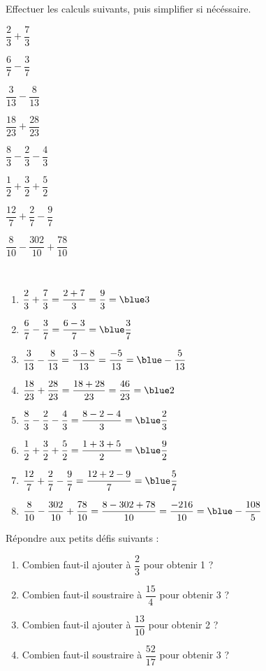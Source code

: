 \begin{colonne*exercice}
\begin{exercice} %
   Effectuer les calculs suivants, puis simplifier si nécéssaire. \medskip
   \begin{colenumerate}{2}
      \item $\dfrac23+\dfrac73$ \medskip
      \item $\dfrac67-\dfrac37$ \medskip
      \item $\dfrac3{13}-\dfrac8{13}$ \medskip
      \item $\dfrac{18}{23}+\dfrac{28}{23}$
      \item $\dfrac83-\dfrac23-\dfrac43$ 
      \item $\dfrac12+\dfrac32+\dfrac52$
      \item $\dfrac{12}7+\dfrac27-\dfrac97$
      \item $\dfrac8{10}-\dfrac{302}{10}+\dfrac{78}{10}$
   \end{colenumerate}
\end{exercice}

\begin{corrige}
   \ \\ [-5mm]
   \begin{enumerate}
      \item $\dfrac23+\dfrac73 =\dfrac{2+7}{3} =\dfrac93 =\blue 3$ \medskip
      \item $\dfrac67-\dfrac37 =\dfrac{6-3}{7} =\blue \dfrac37$ \medskip
      \item $\dfrac3{13}-\dfrac8{13} =\dfrac{3-8}{13} =\dfrac{-5}{13} =\blue -\dfrac{5}{13}$ \medskip
      \item $\dfrac{18}{23}+\dfrac{28}{23} =\dfrac{18+28}{23} =\dfrac{46}{23} =\blue 2$ \medskip
      \item $\dfrac83-\dfrac23-\dfrac43 =\dfrac{8-2-4}{3} =\blue \dfrac23$ \medskip
      \item $\dfrac12+\dfrac32+\dfrac52 =\dfrac{1+3+5}{2} =\blue \dfrac92$ \medskip
      \item $\dfrac{12}7+\dfrac27-\dfrac97 =\dfrac{12+2-9}{7} =\blue \dfrac{5}{7}$ \medskip
      \item $\dfrac8{10}-\dfrac{302}{10}+\dfrac{78}{10} =\dfrac{8-302+78}{10} =\dfrac{-216}{10} =\blue -\dfrac{108}{5}$
   \end{enumerate}
\end{corrige}

\bigskip


\begin{exercice} %
   Répondre aux petits défis suivants :
   \begin{enumerate}
      \item Combien faut-il ajouter à $\dfrac23$ pour obtenir 1 ? \smallskip
      \item Combien faut-il soustraire à $\dfrac{15}4$ pour obtenir 3 ? \smallskip
      \item Combien faut-il ajouter à $\dfrac{13}{10}$ pour obtenir 2 ? \smallskip
      \item Combien faut-il soustraire à $\dfrac{52}{17}$ pour obtenir 3 ?
   \end{enumerate}
\end{exercice}


\end{colonne*exercice}
